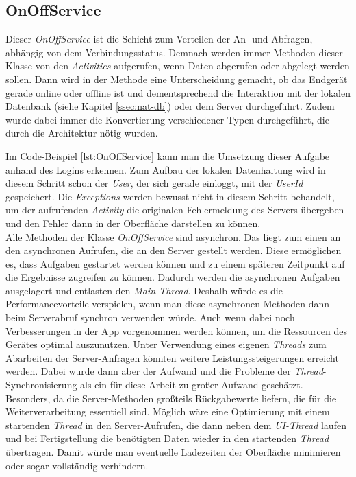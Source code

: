 \subsection{OnOffService}
\label{ssec:nat-onoffservice}
Dieser \textit{OnOffService} ist die Schicht zum Verteilen der An- und Abfragen, abhängig von dem Verbindungsstatus. Demnach werden immer Methoden dieser Klasse von den \textit{Activities} aufgerufen, wenn Daten abgerufen oder abgelegt werden sollen. Dann wird in der Methode eine Unterscheidung gemacht, ob das Endgerät gerade online oder offline ist und dementsprechend die Interaktion mit der lokalen Datenbank (siehe Kapitel \ref{ssec:nat-db}) oder dem Server durchgeführt. Zudem wurde dabei immer die Konvertierung verschiedener Typen durchgeführt, die durch die Architektur nötig wurden.

Im Code-Beispiel \ref{lst:OnOffService} kann man die Umsetzung dieser Aufgabe anhand des Logins erkennen. Zum Aufbau der lokalen Datenhaltung wird in diesem Schritt schon der \textit{User}, der sich gerade einloggt, mit der \textit{UserId} gespeichert. Die \textit{Exceptions} werden bewusst nicht in diesem Schritt behandelt, um der aufrufenden \textit{Activity} die originalen Fehlermeldung des Servers übergeben und den Fehler dann in der Oberfläche darstellen zu können.\\
Alle Methoden der Klasse \textit{OnOffService} sind asynchron. Das liegt zum einen an den asynchronen Aufrufen, die an den Server gestellt werden. Diese ermöglichen es, dass Aufgaben gestartet werden können und zu einem späteren Zeitpunkt auf die Ergebnisse zugreifen zu können. Dadurch werden die asynchronen Aufgaben ausgelagert und entlasten den \textit{Main-Thread}. Deshalb würde es die Performancevorteile verspielen, wenn man diese asynchronen Methoden dann beim Serverabruf synchron verwenden würde. Auch wenn dabei noch Verbesserungen in der App vorgenommen werden können, um die Ressourcen des Gerätes optimal auszunutzen. Unter Verwendung eines eigenen \textit{Threads} zum Abarbeiten der Server-Anfragen könnten weitere Leistungssteigerungen erreicht werden. Dabei wurde dann aber der Aufwand und die Probleme der \textit{Thread}-Synchronisierung als ein für diese Arbeit zu großer Aufwand geschätzt. Besonders, da die Server-Methoden großteils Rückgabewerte liefern, die für die Weiterverarbeitung essentiell sind. Möglich wäre eine Optimierung mit einem startenden \textit{Thread} in den Server-Aufrufen, die dann neben dem \textit{UI-Thread} laufen und bei Fertigstellung die benötigten Daten wieder in den startenden \textit{Thread} übertragen. Damit würde man eventuelle Ladezeiten der Oberfläche minimieren oder sogar vollständig verhindern.

